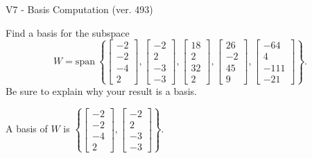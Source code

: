 \begin{exercise}
  \begin{exerciseTitle}V7 - Basis Computation (ver. 493)\end{exerciseTitle}
  \begin{exerciseStatement}
    Find a basis for the subspace 
\[W=\mathrm{span}\ \left\{\left[\begin{array}{r}
-2 \\
-2 \\
-4 \\
2
\end{array}\right] , \left[\begin{array}{r}
-2 \\
2 \\
-3 \\
-3
\end{array}\right] , \left[\begin{array}{r}
18 \\
2 \\
32 \\
2
\end{array}\right] , \left[\begin{array}{r}
26 \\
-2 \\
45 \\
9
\end{array}\right] , \left[\begin{array}{r}
-64 \\
4 \\
-111 \\
-21
\end{array}\right]\right\}.\]
 Be sure to explain why your result is a basis.


  \end{exerciseStatement}
  \begin{exerciseAnswer}
   A basis of \(W\) is  \(\left\{\left[\begin{array}{r}
-2 \\
-2 \\
-4 \\
2
\end{array}\right] , \left[\begin{array}{r}
-2 \\
2 \\
-3 \\
-3
\end{array}\right]\right\}\).
  


  \end{exerciseAnswer}
\end{exercise}